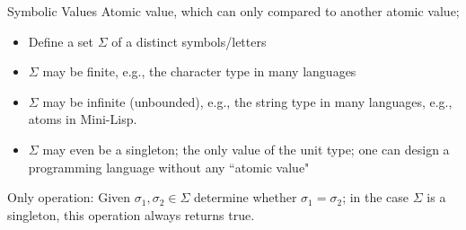 \documentclass[aspectratio=169]{beamer}
\begin{document}
\begin{frame}{Symbolic Values}
Atomic value, which can only compared to another atomic value;
    \begin{itemize}
        \item Define a set $\Sigma$ of a distinct symbols/letters
        \item $\Sigma$ may be finite, e.g., the character type in many languages 
        \item $\Sigma$ may be infinite (unbounded), e.g., the string type in many languages, e.g., atoms in Mini-Lisp. 
        \item $\Sigma$ may even be a singleton; the only value of the unit type; one can design a programming language 
        without any ``atomic value"
    \end{itemize}
Only operation: Given $\sigma_1, \sigma_2\in\Sigma$ determine whether $\sigma_1=\sigma_2$; in the case $\Sigma$ is a singleton, this
operation always returns true.
\end{frame}
\end{document}
